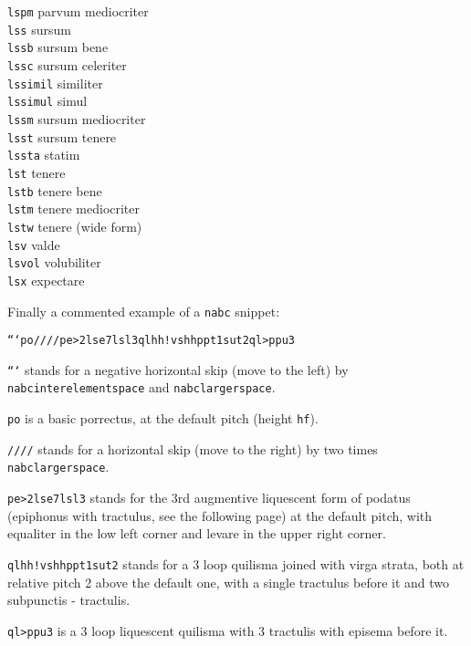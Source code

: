 \documentclass[a4paper]{article}
\begin{document}
{\begin{multicols}{3}
\texttt{lspm}  parvum mediocriter\\
\texttt{lss}  sursum\\
\texttt{lssb}  sursum bene\\
\texttt{lssc}  sursum celeriter\\
\texttt{lssimil}  similiter\\
\texttt{lssimul}  simul\\
\texttt{lssm}  sursum mediocriter\\
\texttt{lsst}  sursum tenere\\
\texttt{lssta}  statim\\
\texttt{lst}  tenere\\
\texttt{lstb}  tenere bene\\
\texttt{lstm}  tenere mediocriter\\
\texttt{lstw}  tenere (wide form)\\
\texttt{lsv}  valde\\
\texttt{lsvol}  volubiliter\\
\texttt{lsx}  expectare
\end{multicols}

Finally a commented example of a \texttt{nabc} snippet:

\texttt{```po////pe>2lse7lsl3qlhh!vshhppt1sut2ql>ppu3}


\texttt{```} stands for a negative horizontal skip (move to the left)
by \texttt{nabcinterelementspace} and \texttt{nabclargerspace}.

\texttt{po}  is a basic porrectus, at the default pitch
(height \texttt{hf}).

\texttt{////} stands for a horizontal skip (move to the right) by
two times \texttt{nabclargerspace}.

\texttt{pe>2lse7lsl3}  stands for the
3rd augmentive liquescent form of podatus (epiphonus with tractulus, see the
following page) at the default pitch, with equaliter in the low left corner
and levare in the upper right corner.

\texttt{qlhh!vshhppt1sut2}  stands for
a 3 loop quilisma joined with virga strata, both at relative pitch 2 above
the default one, with a single tractulus before it and two subpunctis -
tractulis.

\texttt{ql>ppu3}  is a 3 loop liquescent quilisma
with 3 tractulis with episema before it.
}
\end{document}
